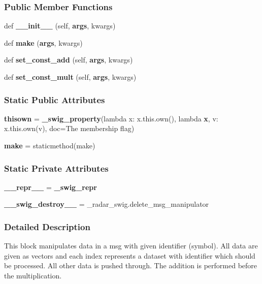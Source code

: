 \subsubsection*{Public Member Functions}
\begin{DoxyCompactItemize}
\item 
def {\bf \+\_\+\+\_\+init\+\_\+\+\_\+} (self, {\bf args}, kwargs)
\item 
def {\bf make} ({\bf args}, kwargs)
\item 
def {\bf set\+\_\+const\+\_\+add} (self, {\bf args}, kwargs)
\item 
def {\bf set\+\_\+const\+\_\+mult} (self, {\bf args}, kwargs)
\end{DoxyCompactItemize}
\subsubsection*{Static Public Attributes}
\begin{DoxyCompactItemize}
\item 
{\bf thisown} = {\bf \+\_\+swig\+\_\+property}(lambda x\+: x.\+this.\+own(), lambda {\bf x}, v\+: x.\+this.\+own(v), doc=\textquotesingle{}The membership flag\textquotesingle{})
\item 
{\bf make} = staticmethod(make)
\end{DoxyCompactItemize}
\subsubsection*{Static Private Attributes}
\begin{DoxyCompactItemize}
\item 
{\bf \+\_\+\+\_\+repr\+\_\+\+\_\+} = {\bf \+\_\+swig\+\_\+repr}
\item 
{\bf \+\_\+\+\_\+swig\+\_\+destroy\+\_\+\+\_\+} = \+\_\+radar\+\_\+swig.\+delete\+\_\+msg\+\_\+manipulator
\end{DoxyCompactItemize}


\subsubsection{Detailed Description}
\begin{DoxyVerb}This block manipulates data in a msg with given identifier (symbol). All data are given as vectors and each index represents a dataset with identifier which should be processed. All other data is pushed through. The addition is performed before the multiplication.\end{DoxyVerb}
 


